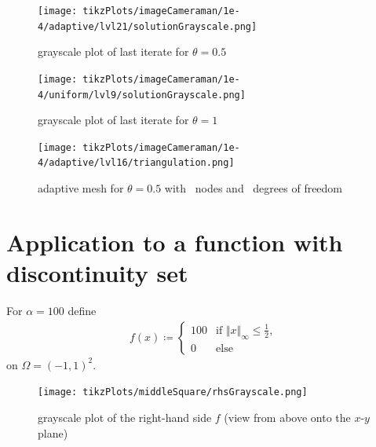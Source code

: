 \documentclass[draft=false,twoside,12pt]{scrreprt}
\begin{document}
\begin{minipage}[t]{0.5\textwidth}
  \begin{figure}[H]
	  \centering
		\texttt{[image: tikzPlots/imageCameraman/1e-4/adaptive/lvl21/solutionGrayscale.png]}
    \caption{grayscale plot of last iterate for $\theta = 0.5$}
  \end{figure}
\end{minipage}
\begin{minipage}[t]{0.5\textwidth}
  \begin{figure}[H]
	  \centering
		\texttt{[image: tikzPlots/imageCameraman/1e-4/uniform/lvl9/solutionGrayscale.png]}
    \caption{grayscale plot of last iterate for $\theta = 1$}
  \end{figure}
\end{minipage}


\begin{figure}[H]
	\centering
  \texttt{[image: tikzPlots/imageCameraman/1e-4/adaptive/lvl16/triangulation.png]}
  \caption{adaptive mesh for $\theta = 0.5$ with \nrNodes\ nodes and 
  \nrDof\ degrees of freedom}
\end{figure}



\section{Application to a function with discontinuity set}
For $\alpha = 100$ define 
\begin{align}
  \label{equ:defMidSqu}
  f(x)\coloneqq 
  \begin{cases}
    100 &\text{if } \Vert x\Vert_\infty\leq \frac{1}{2},\\
    0 &\text{else}
  \end{cases}
\end{align}
on $\Omega = (-1,1)^2$.

\begin{figure}[H]
	\centering
	\texttt{[image: tikzPlots/middleSquare/rhsGrayscale.png]}
  \caption{grayscale plot of the right-hand side $f$ (view from above onto the
  $x$-$y$ plane)}
  \label{fig:rhsMiddleSquare}
\end{figure}
\end{document}
